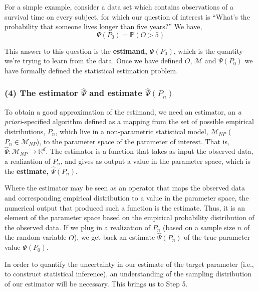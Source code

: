 \documentclass[12pt, krantz2,]{krantz}
\theoremstyle{definition}
\theoremstyle{definition}
\theoremstyle{definition}
\renewcommand{\P}{\mathbb{P}}
\newcommand{\R}{\mathbb{R}}
\newcommand{\M}{\mathcal{M}}
\newcommand{\1}{\mathbbm{1}}
\begin{document}
For a simple example, consider a data set which contains observations of a
survival time on every subject, for which our question of interest is ``What's
the probability that someone lives longer than five years?'' We have,
\begin{equation*}
  \Psi(P_0) = \P(O > 5)
\end{equation*}

This answer to this question is the \textbf{estimand, \(\Psi(P_0)\)}, which is the
quantity we're trying to learn from the data. Once we have defined \(O\), \(\M\) and
\(\Psi(P_0)\) we have formally defined the statistical estimation problem.

\hypertarget{the-estimator-hatpsi-and-estimate-hatpsip_n}{%
\subsubsection*{\texorpdfstring{(4) The estimator \(\hat{\Psi}\) and estimate \(\hat{\Psi}(P_n)\)}{(4) The estimator \textbackslash{}hat\{\textbackslash{}Psi\} and estimate \textbackslash{}hat\{\textbackslash{}Psi\}(P\_n)}}\label{the-estimator-hatpsi-and-estimate-hatpsip_n}}


To obtain a good approximation of the estimand, we need an estimator, an \emph{a
priori}-specified algorithm defined as a mapping from the set of possible
empirical distributions, \(P_n\), which live in a non-parametric statistical
model, \(\M_{NP}\) (\(P_n \in \M_{NP}\)), to the parameter space of the parameter of
interest. That is, \(\hat{\Psi} : \M_{NP} \rightarrow \R^d\). The estimator is a
function that takes as input the observed data, a realization of \(P_n\), and
gives as output a value in the parameter space, which is the \textbf{estimate,
\(\hat{\Psi}(P_n)\)}.

Where the estimator may be seen as an operator that maps the observed data and
corresponding empirical distribution to a value in the parameter space, the
numerical output that produced such a function is the estimate. Thus, it is an
element of the parameter space based on the empirical probability distribution
of the observed data. If we plug in a realization of \(P_n\) (based on a sample
size \(n\) of the random variable \(O\)), we get back an estimate \(\hat{\Psi}(P_n)\)
of the true parameter value \(\Psi(P_0)\).

In order to quantify the uncertainty in our estimate of the target parameter
(i.e., to construct statistical inference), an understanding of the sampling
distribution of our estimator will be necessary. This brings us to Step 5.
\end{document}

